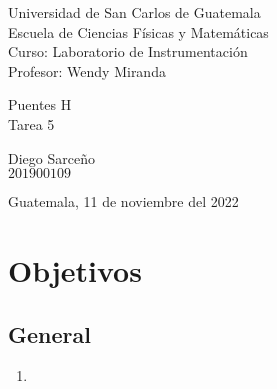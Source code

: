 \documentclass[conference]{IEEEtran}
\begin{document}
\begin{titlepage}



\begin{flushleft}
    Universidad de San Carlos de Guatemala \\
    Escuela de Ciencias Físicas y Matemáticas \\
    Curso: Laboratorio de Instrumentación \\
    Profesor: Wendy Miranda
\end{flushleft}

\vspace{6cm}

\begin{center}
    \huge{Puentes H} \\[1cm]
    \large{Tarea 5}
\end{center}

\vspace{10.5cm}

\begin{flushright}
    Diego Sarceño \\
    $201900109$
\end{flushright}

\vspace{0.5cm}

\begin{center}
    Guatemala, 11 de noviembre del 2022
\end{center}

\end{titlepage}



\begin{abstract}
    
\end{abstract}

\begin{IEEEkeywords}
    
\end{IEEEkeywords}

\section{Objetivos}

\subsection{General}
    \begin{enumerate}[1.]
        \item 
    \end{enumerate}
\end{document}
